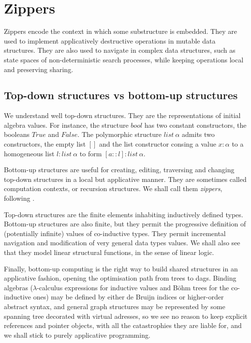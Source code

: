\section{Zippers}

Zippers encode the context in which some substructure is embedded.
They are used to implement applicatively destructive operations in
mutable data structures. They are also used to navigate in complex data
structures, such as state spaces of non-deterministic search processes,
while keeping operations local and preserving sharing.

\subsection{Top-down structures vs bottom-up structures}

We understand well top-down structures. They are the representations of
initial algebra values. For instance, the structure $bool$ has two
constant constructors, the booleans $True$ and $False$. 
The polymorphic structure
$list~\alpha$ admits two constructors, the empty list $[]$ and the
list constructor consing a value $x:\alpha$ to a homogeneous
list $l:list~\alpha$ to form $[a::l]:list~\alpha$. 

Bottom-up structures are useful for creating, editing, traversing and 
changing top-down structures in a local but applicative manner.
They are sometimes called computation contexts, or recursion structures.
We shall call them {\sl zippers}, following \cite{zipper}. 

Top-down structures are the finite elements inhabiting inductively
defined types. Bottom-up structures are also finite, but they permit 
the progressive definition of (potentially infinite) values of co-inductive 
types. They permit incremental navigation and modification of very general
data types values. We shall also see that they model linear structural
functions, in the sense of linear logic.

Finally, bottom-up computing is the right way to build shared structures
in an applicative fashion, opening the optimisation path from trees to dags.
Binding algebras ($\lambda$-calculus expressions for inductive values
and B\"ohm trees for the co-inductive ones) may be defined by either 
de Bruijn indices or higher-order abstract syntax, and general graph structures
may be represented by some spanning tree decorated with virtual adresses,
so we see no reason to keep explicit references and pointer objects, with
all the catastrophies they are liable for, and we shall stick to purely
applicative programming.

